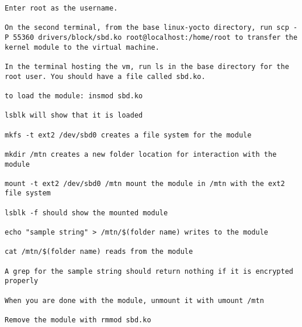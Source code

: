 \documentclass[onecolumn, draftclsnofoot,10pt, compsoc]{IEEEtran}
\begin{document}
\begin{verbatim}
Enter root as the username.

On the second terminal, from the base linux-yocto directory, run scp -P 55360 drivers/block/sbd.ko root@localhost:/home/root to transfer the kernel module to the virtual machine.

In the terminal hosting the vm, run ls in the base directory for the root user. You should have a file called sbd.ko.

to load the module: insmod sbd.ko

lsblk will show that it is loaded

mkfs -t ext2 /dev/sbd0 creates a file system for the module

mkdir /mtn creates a new folder location for interaction with the module

mount -t ext2 /dev/sbd0 /mtn mount the module in /mtn with the ext2 file system

lsblk -f should show the mounted module

echo "sample string" > /mtn/$(folder name) writes to the module

cat /mtn/$(folder name) reads from the module

A grep for the sample string should return nothing if it is encrypted properly

When you are done with the module, unmount it with umount /mtn

Remove the module with rmmod sbd.ko
\end{verbatim}
\end{document}
